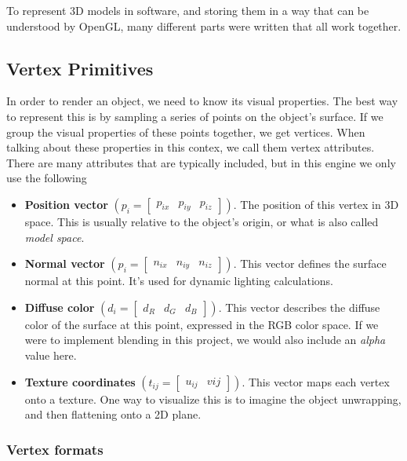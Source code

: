 To represent 3D models in software,
and storing them in a way that can be understood by OpenGL,
many different parts were written that all work together.

\subsection{Vertex Primitives}

In order to render an object,
we need to know its visual properties.
The best way to represent this is by sampling a series of points on the object's surface.
If we group the visual properties of these points together,
we get vertices.
When talking about these properties in this contex,
we call them vertex attributes\cite{game_engine_arch}.
There are many attributes that are typically included,
but in this engine we only use the following

\begin{itemize}
\item \textbf{Position vector}
  $(p_i = [\begin{matrix} p_{ix} & p_{iy} & p_{iz} \end{matrix}])$.
  The position of this vertex in 3D space.
  This is usually relative to the object's origin,
  or what is also called \textit{model space}.
\item \textbf{Normal vector}
  $(p_i = [\begin{matrix} n_{ix} & n_{iy} & n_{iz} \end{matrix}])$.
  This vector defines the surface normal at this point.
  It's used for dynamic lighting calculations.
\item \textbf{Diffuse color}
  $(d_i = [\begin{matrix} d_R & d_G & d_B \end{matrix}])$.
  This vector describes the diffuse color of the surface at this point,
  expressed in the RGB color space.
  If we were to implement blending in this project,
  we would also include an \textit{alpha} value here.
\item \textbf{Texture coordinates}
  $(t_{ij} = [\begin{matrix} u_{ij} & v{ij} \end{matrix}])$.
  This vector maps each vertex onto a texture.
  One way to visualize this is to imagine the object unwrapping,
  and then flattening onto a 2D plane.
\end{itemize}

\subsubsection{Vertex formats}


